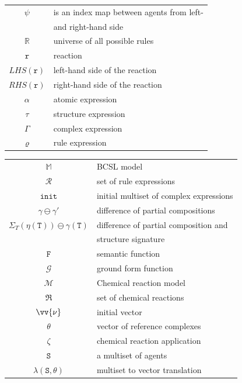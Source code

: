 \documentclass[12pt]{fithesis2}
\begin{document}
\begin{center}
\begin{tabular}{c | l}
$\psi$ & is an index map between agents from left-\\
 & and right-hand side\\
$\mathds{R}$ & universe of all possible rules\\
\hline 
$\mathtt{r}$ & reaction\\
$LHS(\mathtt{r})$ & left-hand side of the reaction\\
$RHS(\mathtt{r})$ & right-hand side of the reaction\\
\hline 
$\alpha$ & atomic expression\\
$\tau$ & structure expression\\
$\Gamma$ & complex expression\\
$\varrho$ & rule expression\\
\end{tabular}
\end{center}

\begin{center}
\begin{tabular}{c | l}
$\mathds{M}$ & BCSL model\\
$\mathcal{R}$ & set of rule expressions\\
$\mathtt{init}$ & initial multiset of complex expressions\\
\hline 
$\gamma \ominus \gamma'$ & difference of partial compositions\\
$\Sigma_T(\mathtt{\eta(\mathtt{T})}) \ominus \gamma(\mathtt{T})$ & difference of partial composition and\\
 & structure signature\\
 \hline 
$\mathtt{F}$ & semantic function\\
$\mathcal{G}$ & ground form function\\
\hline 
$\mathcal{M}$ & Chemical reaction model\\
$\mathfrak{R}$ & set of chemical reactions\\
$\vv{\nu}$ & initial vector\\
$\theta$ & vector of reference complexes\\
\hline 
$\zeta$ & chemical reaction application\\
$\mathtt{S}$ & a multiset of agents\\
$\lambda(\mathtt{S}, \theta)$ & multiset to vector translation\\
\end{tabular}
\end{center}

\end{document}
